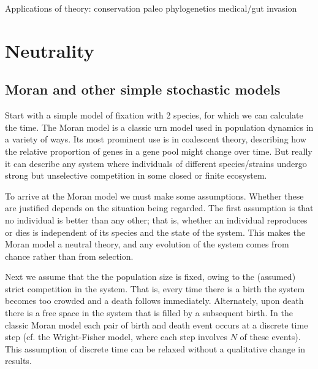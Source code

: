 \documentclass[a4paper,11pt]{article}
\numberwithin{equation}{section} %
\begin{document}
Applications of theory:
conservation
paleo
phylogenetics
medical/gut
invasion%








\section{Neutrality}
\subsection{Moran and other simple stochastic models}
Start with a simple model of fixation with 2 species, for which we can calculate the time. 
The Moran model \cite{Moran1962} is a classic urn model used in population dynamics in a variety of ways. 
Its most prominent use is in coalescent theory, describing how the relative proportion of genes in a gene pool might change over time. 
But really it can describe any system where individuals of different species/strains undergo strong but unselective competition in some closed or finite ecosystem. 

To arrive at the Moran model we must make some assumptions. 
Whether these are justified depends on the situation being regarded. 
The first assumption is that no individual is better than any other; that is, whether an individual reproduces or dies is independent of its species and the state of the system. 
This makes the Moran model a neutral theory, and any evolution of the system comes from chance rather than from selection. 

Next we assume that the the population size is fixed, owing to the (assumed) strict competition in the system. 
That is, every time there is a birth the system becomes too crowded and a death follows immediately. Alternately, upon death there is a free space in the system that is filled by a subsequent birth. 
In the classic Moran model each pair of birth and death event occurs at a discrete time step (cf. the Wright-Fisher model, where each step involves $N$ of these events). 
This assumption of discrete time can be relaxed without a qualitative change in results. 
\end{document}
